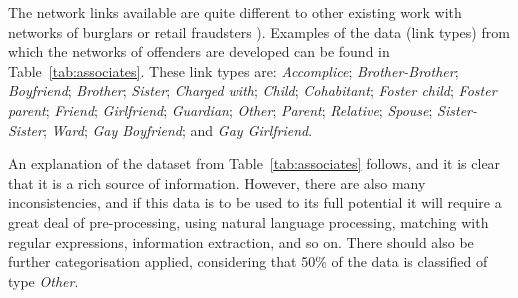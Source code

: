\documentclass[twocolumn]{svjour3}          %
\theoremstyle{definition}
\begin{document}
The network links available are quite different to other existing work
with networks of burglars or retail fraudsters
\citep{OatleyZeleznikowLearyEwart2005,OatleyMcGarryEwart2006}). Examples
of the data (link types) from which the networks of offenders are
developed can be found in Table~\ref{tab:associates}. These link types
are: \emph{Accomplice}; \emph{Brother-Brother}; \emph{Boyfriend};
\emph{Brother}; \emph{Sister}; \emph{Charged with}; \emph{Child};
\emph{Cohabitant}; \emph{Foster child}; \emph{Foster parent};
\emph{Friend}; \emph{Girlfriend}; \emph{Guardian}; \emph{Other};
\emph{Parent}; \emph{Relative}; \emph{Spouse}; \emph{Sister-Sister};
\emph{Ward}; \emph{Gay Boyfriend}; and \emph{Gay Girlfriend}.

An explanation of the dataset from Table~\ref{tab:associates} follows,
and it is clear that it is a rich source of information. However,
there are also many inconsistencies, and if this data is to be used to
its full potential it will require a great deal of pre-processing,
using natural language processing, matching with regular expressions,
information extraction, and so on. There should also be further
categorisation applied, considering that 50\% of the data is
classified of type \emph{Other}.
\end{document}
